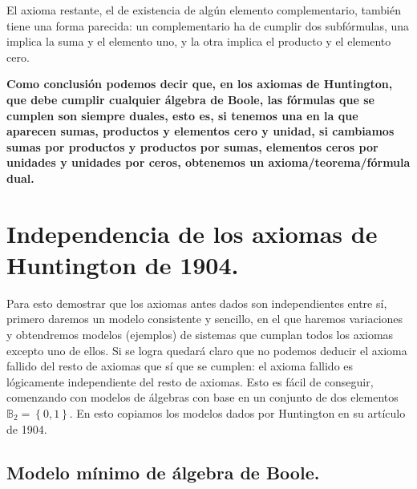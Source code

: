 \documentclass[final,12pt,a4paper,twoside,fleqn]{extbook}
\newcommand{\set}[1]{\ensuremath{\left\lbrace{#1}\right\rbrace}}
\newcommand{\setB}{\ensuremath{\mathbb{B}}}
\theoremstyle{definition}
\theoremstyle{remark}
\begin{document}
	El axioma restante, el de existencia de algún elemento complementario,
también tiene una forma parecida: un complementario ha de cumplir dos
subfórmulas, una implica la suma y el elemento uno, y la otra implica el
producto y el elemento cero.



\textbf{Como conclusión podemos decir que, en los axiomas de Huntington, que
debe cumplir cualquier álgebra de Boole, las fórmulas que se cumplen son
siempre duales, esto es, si tenemos una en la que aparecen sumas, productos y
elementos cero y unidad, si cambiamos sumas por productos y productos por
sumas, elementos ceros por unidades y unidades por ceros, obtenemos un
axioma/teorema/fórmula dual.}



\section{Independencia de los axiomas de Huntington de 1904.}



	Para esto demostrar que los axiomas antes dados son independientes entre
sí, primero daremos un modelo consistente y sencillo, en el que haremos
variaciones y obtendremos modelos (ejemplos) de sistemas que cumplan todos
los axiomas excepto uno de ellos. Si se logra quedará claro que no podemos
deducir el axioma fallido del resto de axiomas que sí que se cumplen: el
axioma fallido es lógicamente independiente del resto de axiomas. Esto es
fácil de conseguir, comenzando con modelos de álgebras con base en un
conjunto de dos elementos \({\setB}_2 = \set{0,1}\). En esto copiamos los
modelos dados por Huntington en su artículo de 1904.



\subsection{Modelo mínimo de álgebra de Boole.}
\end{document}
